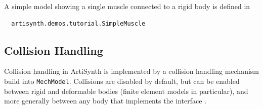 A simple model showing a single muscle connected to a rigid
body is defined in
%
\begin{verbatim}
  artisynth.demos.tutorial.SimpleMuscle
\end{verbatim}
%







\subsection{Collision Handling}

Collision handling in ArtiSynth is implemented by a collision
handling mechanism build into {\tt MechModel}. Collisions are
disabled by default, but can be enabled between rigid and deformable
bodies (finite element models in particular), and more generally
between any body that implements the interface 
.


